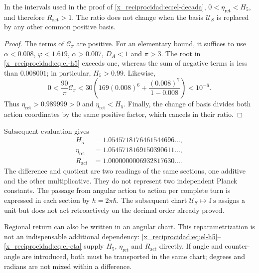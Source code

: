 \begin{proposition}
In the intervals used in the proof of \eqref{x_reciprocidad:eq:el-decada}, \(0<\eta_{\mathrm{ret}}<H_5\), and therefore \(R_{\mathrm{act}}>1\). The ratio does not change when the basis \(\mathcal U_S\) is replaced by any other common positive basis.
\end{proposition}
\begin{proof}
The terms of \(\mathcal C_\pi\) are positive. For an elementary bound, it suffices to use \(\alpha<0.008\), \(\varphi<1.619\), \(\alpha>0.007\), \(D_A<1\) and \(\pi>3\). The root in \eqref{x_reciprocidad:eq:el-h5} exceeds one, whereas the sum of negative terms is less than \(0.008001\); in particular, \(H_5>0.99\). Likewise,
\[
 0<\frac{90}{\pi}\mathcal C_\pi
 <30\left(169(0.008)^6+
           \frac{(0.008)^7}{1-0.008}\right)<10^{-6}.
\]
Thus \(\eta_{\mathrm{ret}}>0.989999>0\) and \(\eta_{\mathrm{ret}}<H_5\). Finally, the change of basis divides both action coordinates by the same positive factor, which cancels in their ratio.
\end{proof}

Subsequent evaluation gives
\begin{align*}
 H_5&=1.0545718176461544696\ldots,\\
 \eta_{\mathrm{ret}}&=1.0545718169150390611\ldots,\\
 R_{\mathrm{act}}&=1.0000000006932817630\ldots.
\end{align*}
The difference and quotient are two readings of the same sections, one additive and the other multiplicative. They do not represent two independent Planck constants. The passage from angular action to action per complete turn is expressed in each section by \(h=2\pi\hbar\). The subsequent chart \(\mathcal U_S\mapsto\mathrm{J\,s}\) assigns a unit but does not act retroactively on the decimal order already proved.

Regional return can also be written in an angular chart. This reparametrization is not an indispensable additional dependency: \eqref{x_reciprocidad:eq:el-h5}--\eqref{x_reciprocidad:eq:el-eta} supply \(H_5\), \(\eta_{\mathrm{ret}}\) and \(R_{\mathrm{act}}\) directly. If angle and counter-angle are introduced, both must be transported in the same chart; degrees and radians are not mixed within a difference.


